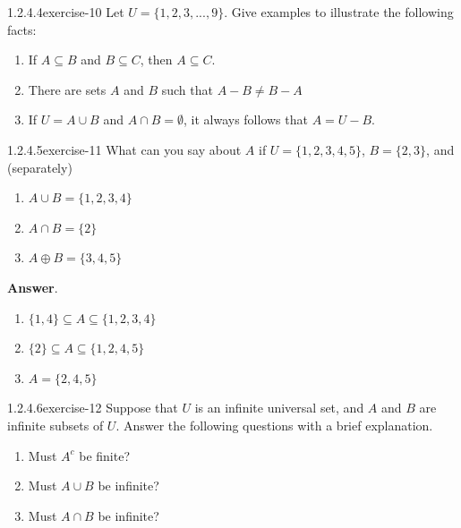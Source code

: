 \documentclass[twoside,10pt,]{book}
\numberwithin{equation}{section}
\begin{document}
\begin{divisionsolution}{1.2.4.4}{}{exercise-10}%
\hypertarget{p-308}{}%
Let \(U= \{1, 2, 3, . . . , 9\}\). Give examples to illustrate the following facts:\leavevmode%
\begin{enumerate}[label=(\alph*)]
\item\hypertarget{li-243}{}\hypertarget{p-309}{}%
If \(A \subseteq  B\) and \(B \subseteq C\), then \(A\subseteq C\).%
\item\hypertarget{li-244}{}\hypertarget{p-310}{}%
There are sets \(A\) and \(B\) such that \(A - B \neq  B - A\)%
\item\hypertarget{li-245}{}\hypertarget{p-311}{}%
If \(U = A\cup  B\) and \(A \cap  B = \emptyset\), it always follows that \(A = U - B\).%
\end{enumerate}
%
\end{divisionsolution}%
\begin{divisionsolution}{1.2.4.5}{}{exercise-11}%
\hypertarget{p-312}{}%
What can you say about \(A\) if \(U = \{1, 2, 3, 4, 5\}\), \(B = \{2, 3\}\), and (separately)\leavevmode%
\begin{enumerate}[label=(\alph*)]
\item\hypertarget{li-246}{}\hypertarget{p-313}{}%
\(A \cup B = \{1, 2, 3,4\}\)%
\item\hypertarget{li-247}{}\hypertarget{p-314}{}%
\(A \cap  B = \{2\}\)%
\item\hypertarget{li-248}{}\hypertarget{p-315}{}%
\(A \oplus  B = \{3, 4, 5\}\)%
\end{enumerate}
%
\par\smallskip%
\noindent\textbf{Answer}.\quad%
\hypertarget{p-316}{}%
\leavevmode%
\begin{enumerate}[label=(\alph*)]
\item\hypertarget{li-249}{}\hypertarget{p-317}{}%
\(\{1, 4\} \subseteq  A \subseteq  \{1, 2, 3, 4\}\)%
\item\hypertarget{li-250}{}\hypertarget{p-318}{}%
\(\{2\} \subseteq  A \subseteq  \{1, 2, 4, 5\}\)%
\item\hypertarget{li-251}{}\hypertarget{p-319}{}%
\(A = \{2, 4, 5\}\)%
\end{enumerate}
%
\end{divisionsolution}%
\begin{divisionsolution}{1.2.4.6}{}{exercise-12}%
\hypertarget{p-320}{}%
Suppose that \(U\) is an infinite universal set, and \(A\) and \(B\) are infinite subsets of \(U\). Answer the following questions with a brief explanation.%
\par
\hypertarget{p-321}{}%
\leavevmode%
\begin{enumerate}[label=(\alph*)]
\item\hypertarget{li-252}{}\hypertarget{p-322}{}%
Must \(A^c\) be finite?%
\item\hypertarget{li-253}{}\hypertarget{p-323}{}%
Must \(A\cup B\) be infinite?%
\item\hypertarget{li-254}{}\hypertarget{p-324}{}%
Must \(A\cap B\) be infinite?%
\end{enumerate}
%
\end{divisionsolution}%
\end{document}
